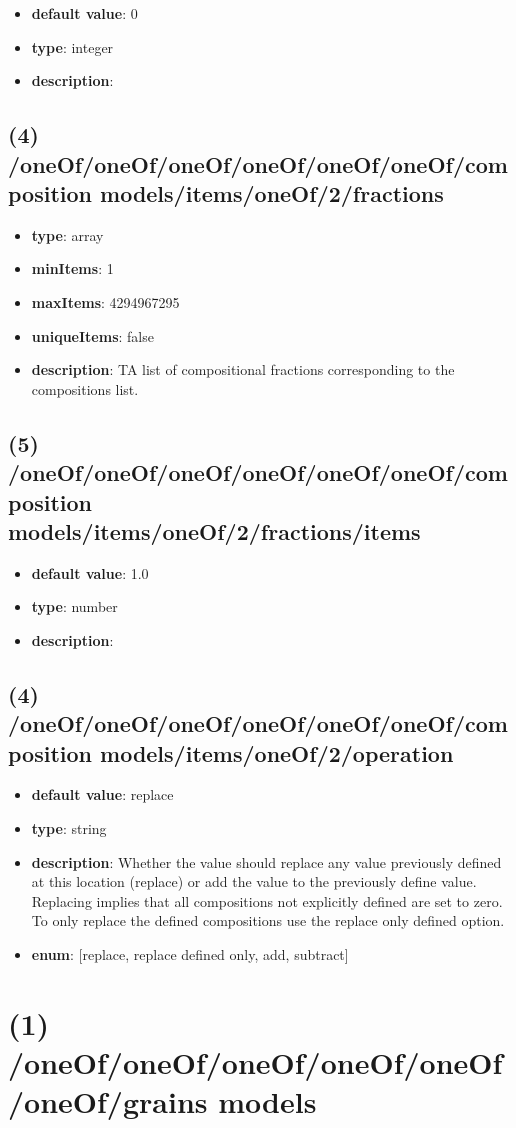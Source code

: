 \begin{itemize}[leftmargin=5em]\item {\bf default value}: 0
\item {\bf type}: integer
\item {\bf description}: 
\end{itemize}\subsection{(4) /oneOf/oneOf/oneOf/oneOf/oneOf/oneOf/composition models/items/oneOf/2/fractions}
\begin{itemize}[leftmargin=4em]\item {\bf type}: array
\item {\bf minItems}: 1
\item {\bf maxItems}: 4294967295
\item {\bf uniqueItems}: false
\item {\bf description}: TA list of compositional fractions corresponding to the compositions list.
\end{itemize}\subsection{(5) /oneOf/oneOf/oneOf/oneOf/oneOf/oneOf/composition models/items/oneOf/2/fractions/items}
\begin{itemize}[leftmargin=5em]\item {\bf default value}: 1.0
\item {\bf type}: number
\item {\bf description}: 
\end{itemize}\subsection{(4) /oneOf/oneOf/oneOf/oneOf/oneOf/oneOf/composition models/items/oneOf/2/operation}
\begin{itemize}[leftmargin=4em]\item {\bf default value}: replace
\item {\bf type}: string
\item {\bf description}: Whether the value should replace any value previously defined at this location (replace) or add the value to the previously define value. Replacing implies that all compositions not explicitly defined are set to zero. To only replace the defined compositions use the replace only defined option.
\item {\bf enum}: [replace, replace defined only, add, subtract]\end{itemize}\section{(1) /oneOf/oneOf/oneOf/oneOf/oneOf/oneOf/grains models}
